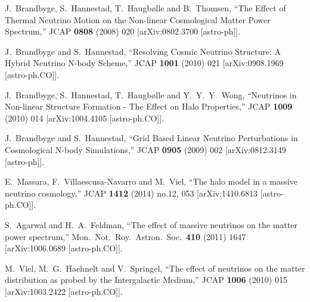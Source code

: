 \documentclass[11pt,a4paper]{article}
\renewcommand\({\left(}
\renewcommand\){\right)}
\renewcommand\[{\left[}
\renewcommand\]{\right]}
\begin{document}
\begin{thebibliography}{10}
  J.~Brandbyge, S.~Hannestad, T.~Haugb{\o}lle and B.~Thomsen,
  ``The Effect of Thermal Neutrino Motion on the Non-linear Cosmological Matter Power Spectrum,''
  JCAP {\bf 0808} (2008) 020
  [arXiv:0802.3700 [astro-ph]].
  
  J.~Brandbyge and S.~Hannestad,
``Resolving Cosmic Neutrino Structure: A Hybrid Neutrino N-body Scheme,''
  JCAP {\bf 1001} (2010) 021
  [arXiv:0908.1969 [astro-ph.CO]].
  
  J.~Brandbyge, S.~Hannestad, T.~Haugb{\o}lle and Y.~Y.~Y.~Wong,
  ``Neutrinos in Non-linear Structure Formation - The Effect on Halo Properties,''
  JCAP {\bf 1009} (2010) 014
  [arXiv:1004.4105 [astro-ph.CO]].
  	
  J.~Brandbyge and S.~Hannestad,
  ``Grid Based Linear Neutrino Perturbations in Cosmological N-body Simulations,''
  JCAP {\bf 0905} (2009) 002
  [arXiv:0812.3149 [astro-ph]].
 
  E.~Massara, F.~Villaescusa-Navarro and M.~Viel,
  ``The halo model in a massive neutrino cosmology,''
  JCAP {\bf 1412} (2014) no.12,  053
  [arXiv:1410.6813 [astro-ph.CO]].
		
  S.~Agarwal and H.~A.~Feldman,
  ``The effect of massive neutrinos on the matter power spectrum,''
  Mon.\ Not.\ Roy.\ Astron.\ Soc.\  {\bf 410} (2011) 1647
  [arXiv:1006.0689 [astro-ph.CO]].
		
  M.~Viel, M.~G.~Haehnelt and V.~Springel,
  ``The effect of neutrinos on the matter distribution as probed by the Intergalactic Medium,''
  JCAP {\bf 1006} (2010) 015
  [arXiv:1003.2422 [astro-ph.CO]].
  

\end{thebibliography}
\end{document}
